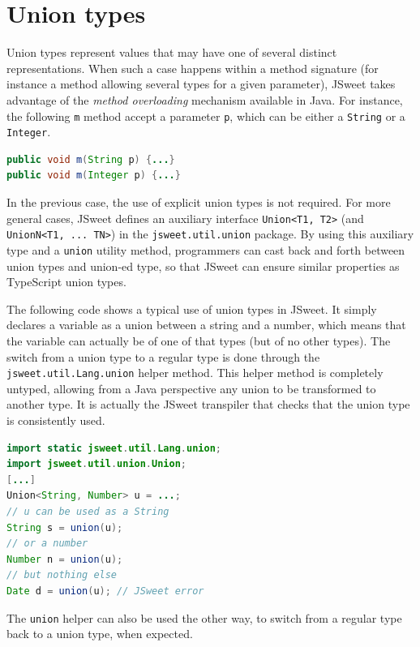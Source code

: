 \documentclass[a4paper]{report}
\begin{document}
\section{Union types}

Union types represent values that may have one of several distinct representations. When such a case happens within a method signature (for instance a method allowing several types for a given parameter), JSweet takes advantage of the \emph{method overloading} mechanism available in Java. For instance, the following \texttt{m} method accept a parameter \texttt{p}, which can be either a \texttt{String} or a \texttt{Integer}.

\begin{lstlisting}[language=Java]
public void m(String p) {...}
public void m(Integer p) {...}
\end{lstlisting}


In the previous case, the use of explicit union types is not required. For more general cases, JSweet defines an auxiliary interface \texttt{Union<T1, T2>} (and \texttt{UnionN<T1, ... TN>}) in the \texttt{jsweet.\-util.\-union} package. By using this auxiliary type and a \texttt{union} utility method, programmers can cast back and forth between union types and union-ed type, so that JSweet can ensure similar properties as TypeScript union types. 

The following code shows a typical use of union types in JSweet. It simply declares a variable as a union between a string and a number, which means that the variable can actually be of one of that types (but of no other types). The switch from a union type to a regular type is done through the \texttt{jsweet\-.util\-.Lang\-.union} helper method. This helper method is completely untyped, allowing from a Java perspective any union to be transformed to another type. It is actually the JSweet transpiler that checks that the union type is consistently used.

\begin{lstlisting}[language=Java]
import static jsweet.util.Lang.union;
import jsweet.util.union.Union;
[...]
Union<String, Number> u = ...;
// u can be used as a String
String s = union(u);
// or a number
Number n = union(u);
// but nothing else
Date d = union(u); // JSweet error
\end{lstlisting}

The \texttt{union} helper can also be used the other way, to switch from a regular type back to a union type, when expected.
\end{document}
